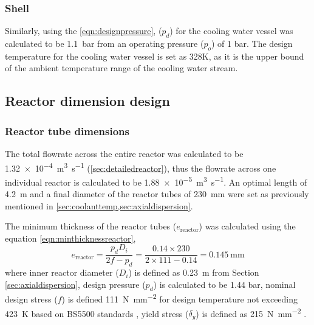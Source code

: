 \subsubsection{Shell}
Similarly, using the \cref{eqn:designpressure}, ($p_d$) for the cooling water vessel was calculated to be \SI{1.1}{\bar} from an operating pressure ($p_o$) of 1 bar. The design temperature for the cooling water vessel is set as 328K, as it is the upper bound of the ambient temperature range of the cooling water stream. 

\subsection{Reactor dimension design}
\label{sec:reactordimensions}

\subsubsection{Reactor tube dimensions}
\label{sec:reactortube}
The total flowrate across the entire reactor was calculated to be \SI{1.32e-4}{\cubic\m\per\s} (\cref{sec:detailedreactor}), thus the flowrate across one individual reactor is calculated to be  \SI{1.88e-5}{\cubic\m\per\s}. An optimal length of \SI{4.2}{\metre} and a final diameter of the reactor tubes of \SI{230}{\milli \metre} were set as previously mentioned in \cref{sec:coolanttemp,sec:axialdispersion}. 

The minimum thickness of the reactor tubes ($e_\mathrm{reactor}$) was calculated using the equation \ref{eqn:minthicknessreactor},
\begin{equation}
    e_\mathrm{reactor} = \frac{p_dD_i}{2f-p_d} = \frac{0.14 \times 230}{2 \times 111 - 0.14} = \SI{0.145}{\mm}
    \label{eqn:minthicknessreactor}
\end{equation}
where inner reactor diameter ($D_i$) is defined as \SI{0.23}{\metre} from Section \ref{sec:axialdispersion}, design pressure ($p_d$) is calculated to be 1.44 bar, nominal design stress ($f$) is defined \SI{111}{\N\per\square\mm} for design temperature not exceeding \SI{423}{\K} based on BS5500 standards , yield stress ($\delta_y$) is defined as \SI{215}{\N\per\square\mm} \cite{noauthor_unfired_nodate}.


